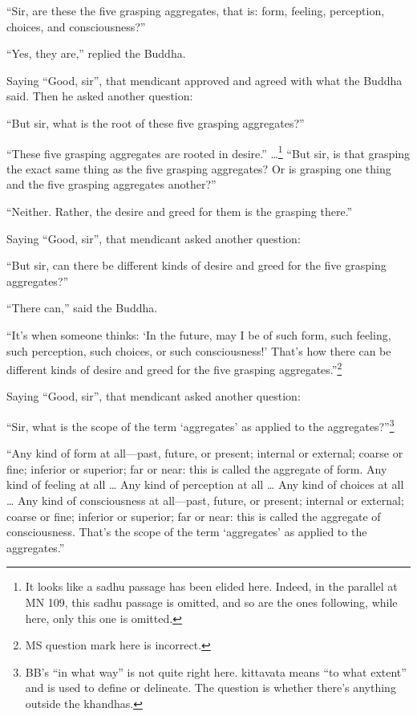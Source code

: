 \documentclass[12pt,openany]{book}%
\begin{document}
“Sir, are these the five grasping aggregates, that is: form, feeling, perception, choices, and consciousness?” 

“Yes, they are,” replied the Buddha. 

Saying “Good, sir”, that mendicant approved and agreed with what the Buddha said. Then he asked another question: 

“But sir, what is the root of these five grasping aggregates?” 

“These five grasping aggregates are rooted in desire.” …\footnote{It looks like a sadhu passage has been elided here. Indeed, in the parallel at MN 109, this sadhu passage is omitted, and so are the ones following, while here, only this one is omitted. } “But sir, is that grasping the exact same thing as the five grasping aggregates? Or is grasping one thing and the five grasping aggregates another?” 

“Neither. Rather, the desire and greed for them is the grasping there.” 

Saying “Good, sir”, that mendicant asked another question: 

“But sir, can there be different kinds of desire and greed for the five grasping aggregates?” 

“There can,” said the Buddha. 

“It’s when someone thinks: ‘In the future, may I be of such form, such feeling, such perception, such choices, or such consciousness!’ That’s how there can be different kinds of desire and greed for the five grasping aggregates.”\footnote{MS question mark here is incorrect. } 

Saying “Good, sir”, that mendicant asked another question: 

“Sir, what is the scope of the term ‘aggregates’ as applied to the aggregates?”\footnote{BB’s “in what way” is not quite right here. kittavata means “to what extent” and is used to define or delineate. The question is whether there’s anything outside the khandhas. } 

“Any kind of form at all—past, future, or present; internal or external; coarse or fine; inferior or superior; far or near: this is called the aggregate of form. Any kind of feeling at all … Any kind of perception at all … Any kind of choices at all … Any kind of consciousness at all—past, future, or present; internal or external; coarse or fine; inferior or superior; far or near: this is called the aggregate of consciousness. That’s the scope of the term ‘aggregates’ as applied to the aggregates.” 
\end{document}

